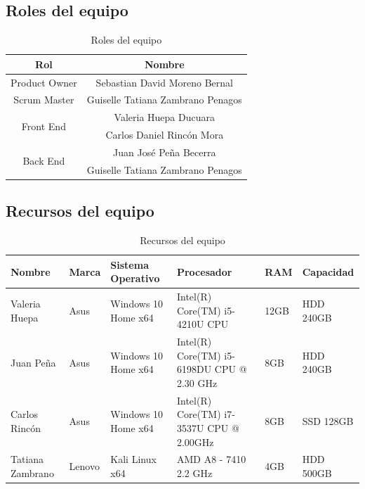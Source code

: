 \documentclass[a4paper,12 pt]{article}
\begin{document}
\subsection{Roles del equipo}

\begin{table}[H]
    \centering
    \small{
    \begin{tabular}{|c|c|}
        \hline
        \textbf{Rol}   &   \textbf{Nombre}  \\ 
        \hline
        Product Owner   &   Sebastian David Moreno Bernal\\
        \hline
        Scrum Master   &   Guiselle Tatiana Zambrano Penagos\\
        \hline
        \multirow{2}{2cm}{Front End}    &   Valeria Huepa Ducuara\\
            &   Carlos Daniel Rincón Mora\\
        \hline
        \multirow{2}{2cm}{Back End}    &   Juan José Peña Becerra\\
            &   Guiselle Tatiana Zambrano Penagos\\
        \hline
         
    \end{tabular}
    \caption{Roles del equipo}}
    \label{T00}
\end{table}{}

\subsection{Recursos del equipo}

\begin{table}[H]
    \centering
    \small{
    \begin{tabular}{|M{2cm}|M{1.5cm}|M{3cm}|M{3cm}|M{1.5cm}|M{2cm}|}
        \hline
        \textbf{Nombre}    &\textbf{Marca}     &\textbf{Sistema Operativo} 
        &\textbf{Procesador}   &\textbf{RAM}   &\textbf{Capacidad}\\
        \hline
        Valeria Huepa                       &Asus   &Windows 10 Home x64 
        & Intel(R) Core(TM) i5-4210U CPU    &12GB   &HDD 240GB \\
        \hline
        Juan Peña                           &Asus   &Windows 10 Home x64
        &Intel(R) Core(TM) i5-6198DU CPU @ 2.30 GHz &8GB    &HDD 240GB\\
        \hline
        Carlos Rincón                       &Asus   &Windows 10 Home x64
        &Intel(R) Core(TM) i7-3537U CPU @ 2.00GHz   &8GB    &SSD 128GB\\
        \hline
        Tatiana Zambrano                    &Lenovo &Kali Linux x64
        &AMD A8 - 7410 2.2 GHz              &4GB    &HDD 500GB\\
        \hline
    \end{tabular}
    \caption{Recursos del equipo}
    \label{T01}}
\end{table}{}
\end{document}
